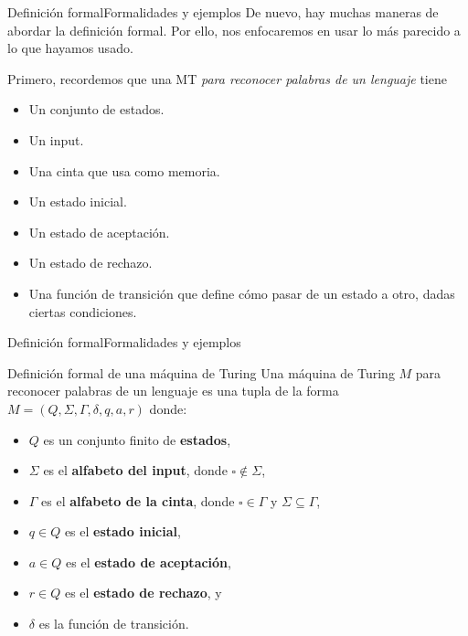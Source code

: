 \documentclass[spanish, handout]{beamer}
\begin{document}
\begin{frame}{Definición formal}{Formalidades y ejemplos}
    De nuevo, hay muchas maneras de abordar la definición formal.
    Por ello, nos enfocaremos en usar lo más parecido a lo que hayamos usado. \pause

    \bigskip

    Primero, recordemos que una MT \textit{para reconocer palabras de un lenguaje} tiene
    \begin{itemize}
        \item Un conjunto de estados. \pause
        \item Un input. \pause
        \item Una cinta que usa como memoria. \pause
        \item Un estado inicial. \pause
        \item Un estado de aceptación. \pause
        \item Un estado de rechazo. \pause
        \item Una función de transición que define cómo pasar de un estado a otro, dadas ciertas condiciones.
    \end{itemize}
\end{frame}

\begin{frame}{Definición formal}{Formalidades y ejemplos}
    \begin{block}{Definición formal de una máquina de Turing}
        Una máquina de Turing $M$ para reconocer palabras de un lenguaje es una tupla de la forma $M = (Q, \Sigma, \Gamma, \delta, q, a, r)$ donde: \pause

        \begin{itemize}
            \item $Q$ es un conjunto finito de \textbf{estados}, \pause
            \item $\Sigma$ es el \textbf{alfabeto del input}, donde $\square \not \in \Sigma$, \pause
            \item $\Gamma$ es el \textbf{alfabeto de la cinta}, donde $\square \in \Gamma$ y $\Sigma \subseteq \Gamma$, \pause
            \item $q \in Q$ es el \textbf{estado inicial}, \pause
            \item $a \in Q$ es el \textbf{estado de aceptación}, \pause
            \item $r \in Q$ es el \textbf{estado de rechazo}, y \pause
            \item $\delta$ es la función de transición.
        \end{itemize}
    \end{block}
\end{frame}
\end{document}
